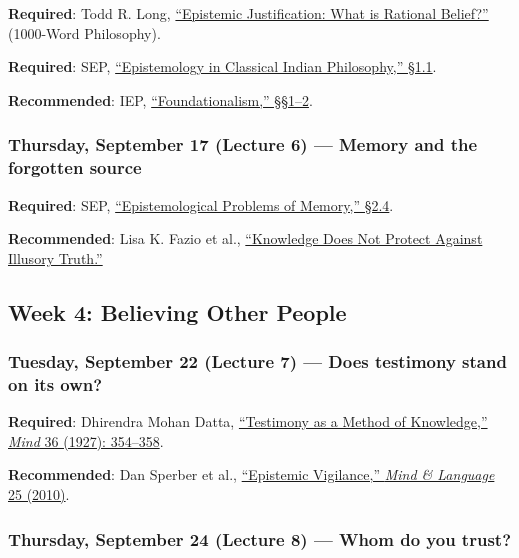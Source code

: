 \documentclass[
  letterpaper,
  DIV=11,
  numbers=noendperiod]{scrartcl}
\begin{document}
\textbf{Required}: Todd R. Long,
\href{https://1000wordphilosophy.com/2023/03/19/epistemic-justification/}{``Epistemic
Justification: What is Rational Belief?''} (1000-Word Philosophy).

\textbf{Required}: SEP,
\href{https://plato.stanford.edu/entries/epistemology-india/\#KnowKnowSour}{``Epistemology
in Classical Indian Philosophy,'' §1.1}.

\textbf{Recommended}: IEP,
\href{https://iep.utm.edu/foundationalism-in-epistemology/}{``Foundationalism,''
§§1--2}.

\subsubsection{Thursday, September 17 (Lecture 6) --- Memory and the
forgotten
source}\label{thursday-september-17-lecture-6-memory-and-the-forgotten-source}

\textbf{Required}: SEP,
\href{https://plato.stanford.edu/entries/memory-episprob/\#PresGene}{``Epistemological
Problems of Memory,'' §2.4}.

\textbf{Recommended}: Lisa K. Fazio et al.,
\href{https://www.apa.org/pubs/journals/features/xge-0000098.pdf}{``Knowledge
Does Not Protect Against Illusory Truth.''}

\subsection{Week 4: Believing Other
People}\label{week-4-believing-other-people}

\subsubsection{Tuesday, September 22 (Lecture 7) --- Does testimony
stand on its
own?}\label{tuesday-september-22-lecture-7-does-testimony-stand-on-its-own}

\textbf{Required}: Dhirendra Mohan Datta,
\href{https://academic.oup.com/mind/article-abstract/XXXVI/143/354/1029875}{``Testimony
as a Method of Knowledge,'' \emph{Mind} 36 (1927): 354--358}.

\textbf{Recommended}: Dan Sperber et al.,
\href{https://www.dan.sperber.fr/wp-content/uploads/2010_clement-et-al_epistemic-vigilance.pdf}{``Epistemic
Vigilance,'' \emph{Mind \& Language} 25 (2010)}.

\subsubsection{Thursday, September 24 (Lecture 8) --- Whom do you
trust?}\label{thursday-september-24-lecture-8-whom-do-you-trust}
\end{document}

